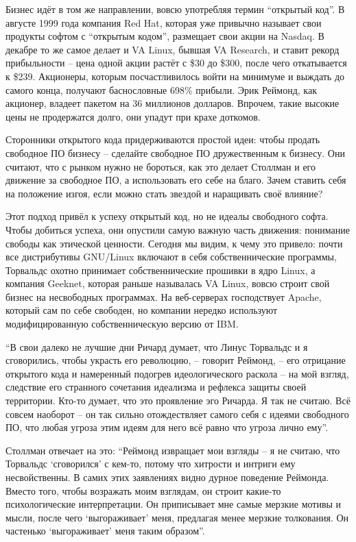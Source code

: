Бизнес идёт в том же направлении, вовсю употребляя термин \enquote{открытый код}. В августе 1999 года компания Red Hat, которая уже привычно называет свои продукты софтом с \enquote{открытым кодом}, размещает свои акции на Nasdaq. В декабре то же самое делает и VA Linux, бывшая VA Research, и ставит рекорд прибыльности -- цена одной акции растёт с \$30 до \$300, после чего откатывается к \$239. Акционеры, которым посчастливилось войти на минимуме и выждать до самого конца, получают баснословные 698\% прибыли. Эрик Реймонд, как акционер, владеет пакетом на 36 миллионов долларов. Впрочем, такие высокие цены не продержатся долго, они упадут при крахе доткомов.

Сторонники открытого кода придерживаются простой идеи: чтобы продать свободное ПО бизнесу -- сделайте свободное ПО дружественным к бизнесу. Они считают, что с рынком нужно не бороться, как это делает Столлман и его движение за свободное ПО, а использовать его себе на благо. Зачем ставить себя на положение изгоя, если можно стать звездой и наращивать своё влияние?

Этот подход привёл к успеху открытый код, но не идеалы свободного софта. Чтобы добиться успеха, они опустили самую важную часть движения: понимание свободы как этической ценности. Сегодня мы видим, к чему это привело: почти все дистрибутивы GNU/Linux включают в себя собственнические программы, Торвальдс охотно принимает собственнические прошивки в ядро Linux, а компания Geeknet, которая раньше называлась VA Linux, вовсю строит свой бизнес на несвободных программах. На веб-серверах господствует Apache, который сам по себе свободен, но компании нередко используют модифицированную собственническую версию от IBM.

\enquote{В свои далеко не лучшие дни Ричард думает, что Линус Торвальдс и я сговорились, чтобы украсть его революцию, -- говорит Реймонд, -- его отрицание открытого кода и намеренный подогрев идеологического раскола -- на мой взгляд, следствие его странного сочетания идеализма и рефлекса защиты своей территории. Кто-то думает, что это проявление эго Ричарда. Я так не считаю. Всё совсем наоборот -- он так сильно отождествляет самого себя с идеями свободного ПО, что любая угроза этим идеям для него всё равно что угроза лично ему}.

Столлман отвечает на это: \enquote{Реймонд извращает мои взгляды -- я не считаю, что Торвальдс \enquote{сговорился} с кем-то, потому что хитрости и интриги ему несвойственны. В самих этих заявлениях видно дурное поведение Реймонда. Вместо того, чтобы возражать моим взглядам, он строит какие-то психологические интерпретации. Он приписывает мне самые мерзкие мотивы и мысли, после чего \enquote{выгораживает} меня, предлагая менее мерзкие толкования. Он частенько \enquote{выгораживает} меня таким образом}.

